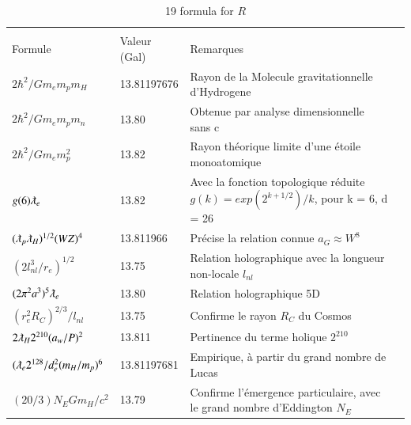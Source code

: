 \documentclass[a4paper,9pt]{article}
\newcounter{col}
\begin{document}
\begin{table}
\caption[Table \ref{tab:6:table6}: 19 Hubble radius formulas]{19 formula for $R$}
\label{tab:6:table6}
  \hskip-2.0cm\begin{tabular}{llll}
    \toprule
    \multicolumn{3}{c}{}                   \\
    \cmidrule(r){1-3}
    Formule     & Valeur (Gal)  & Remarques \\
    \midrule
 
 $ 2\hbar^2/Gm_em_pm_H $ & 13.81197676 & Rayon de la Molecule gravitationnelle d'Hydrogene \cite{Sanchez2}   \\
 
 $ 2\hbar^2/Gm_em_pm_n $ & 13.80 & Obtenue par analyse dimensionnelle sans c \cite{Sanchez4}  \\
 
 $ 2\hbar^2/Gm_em_p^2 $ & 13.82 & Rayon théorique limite d'une étoile monoatomique \cite{Davies2}  \\
 
 $ g(6) \lambdabar_{e} $ & 13.82 & Avec la fonction topologique réduite $g(k) = exp(2^{k+1/2})/k$, pour k = 6, d = 26  \\ 
 
 $ (\lambdabar_{p} \lambdabar_{H})^{1/2} (WZ)^4$  & 13.811966    & Précise la relation connue $a_G \approx W^8$ \cite{Rees} \\
 
 
 
 $ (2l_{nl}^3/r_e)^{1/2}$  & 13.75    & Relation holographique avec la longueur non-locale $l_{nl}$ \\
 
 $(2\pi^2 a^3)^5 \lambdabar_{e} $ & 13.80 & Relation holographique 5D  \\
 
 
  $ (r_e^2R_C)^{2/3}/l_{nl}$  & 13.75    & Confirme le rayon $R_C$ du Cosmos \\
  
  
  
  
 $ 2\lambdabar_{H}2^{210} (a_w/P)^2  $ & 13.811 & Pertinence du terme holique $2^{210}$ \\
 
 $(\lambdabar_{e} 2^{128}/d_e^2(m_H/m_p)^6$  & 13.81197681    & Empirique, à partir du grand nombre de Lucas \\
 
 
 $(20/3)N_EGm_H/c^2$  & 13.79    & Confirme l'émergence particulaire, avec le grand nombre d'Eddington $N_E$ \\
 

\end{tabular}
\end{table}
\end{document}
